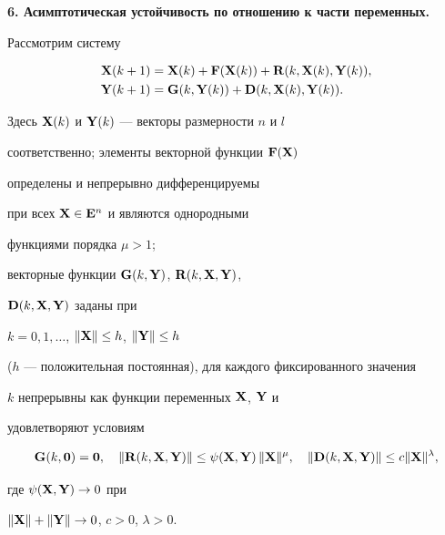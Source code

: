 {\bf 6. Асимптотическая устойчивость по отношению к части переменных.}


Рассмотрим систему


\begin{equation}


\begin{split}


\bold X(k+1)&=\bold X(k)+\bold F(\bold X(k))+


\bold R(k,\bold X(k),\bold Y(k)), \\


\bold Y(k+1)&=\bold G(k,\bold Y(k))+


\bold D(k,\bold X(k),\bold Y(k)).


\end{split}


\end{equation}


Здесь $\bold X(k)$ и $\bold Y(k)$ --- векторы размерности $n$ и $l$


соответственно; элементы векторной функции $\bold F(\bold X)$ 


определены и непрерывно дифференцируемы


при всех $\bold X\in \bold E^n$ и являются однородными


функциями порядка $\mu>1$;


векторные функции $\bold G(k,\bold Y)$, $\bold R(k,\bold X,\bold Y)$,


$\bold D(k,\bold X,\bold Y)$ заданы при


$k=0,1,\dotsc$, $\|\bold X\|\leq h$, $\|\bold Y\|\leq h$


($h$ --- положительная постоянная), для каждого фиксированного значения


$k$ непрерывны как функции переменных $\bold X$, $\bold Y$ и


удовлетворяют условиям


$$


\bold G(k, \bold 0)= \bold 0,


\quad \|\bold R(k,\bold X,\bold Y)\|\leq


\psi(\bold X,\bold Y) \, \|\bold X\|^\mu,


\quad \|\bold D(k,\bold X,\bold Y)\|\leq c \|\bold X\|^\lambda,


$$


где $\psi(\bold X,\bold Y) \to 0$ при


$\|\bold X\|+\|\bold Y\|\to 0$, $c>0$, $\lambda>0$.






